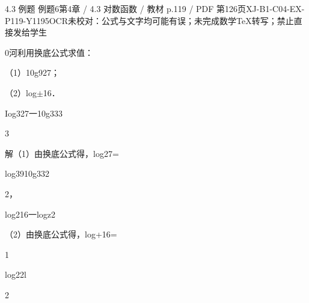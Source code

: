 \begin{bankitem}{4.3 例题 例题6}{第4章 / 4.3 对数函数 / 教材 p.119 / PDF 第126页}{XJ-B1-C04-EX-P119-Y1195}{OCR未校对：公式与文字均可能有误；未完成数学TeX转写；禁止直接发给学生}
\begin{ocrdraft}
\par
0河利用换底公式求值：
\par
（1）10g927；
\par
（2）log\ensuremath{\pm}16．
\par
Iog327一10g333
\par
3
\par
解（1）由换底公式得，log27=
\par
log3910g332
\par
2，
\par
log216一logz2
\par
（2）由换底公式得，log+16=
\par
1
\par
log22l
\par
2
\end{ocrdraft}
\end{bankitem}
